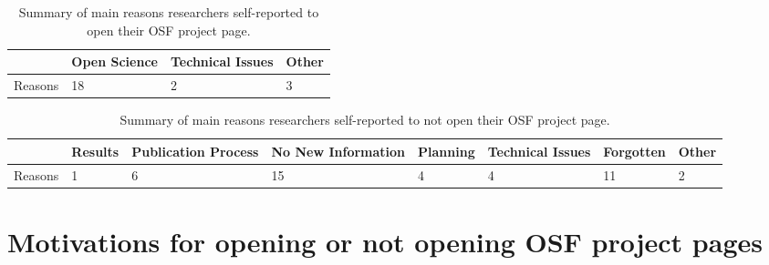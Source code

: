 \documentclass[
  ,jou, a4paper,floatsintext]{apa6}
\begin{document}
\begin{table}[tbp]

\begin{center}
\begin{threeparttable}

\caption{\label{tab:reasonopen}Summary of main reasons researchers self-reported to open their OSF project page.}

\begin{tabular}{llll}
\toprule
 & \multicolumn{1}{c}{Open Science} & \multicolumn{1}{c}{Technical Issues} & \multicolumn{1}{c}{Other}\\
\midrule
Reasons & 18 & 2 & 3\\
\bottomrule
\end{tabular}

\end{threeparttable}
\end{center}

\end{table}

\begin{table}[tbp]

\begin{center}
\begin{threeparttable}

\caption{\label{tab:reasonclosed}Summary of main reasons researchers self-reported to not open their OSF project page.}

\begin{tabular}{llllllll}
\toprule
 & \multicolumn{1}{c}{Results} & \multicolumn{1}{c}{Publication Process} & \multicolumn{1}{c}{No New Information} & \multicolumn{1}{c}{Planning} & \multicolumn{1}{c}{Technical Issues} & \multicolumn{1}{c}{Forgotten} & \multicolumn{1}{c}{Other}\\
\midrule
Reasons & 1 & 6 & 15 & 4 & 4 & 11 & 2\\
\bottomrule
\end{tabular}

\end{threeparttable}
\end{center}

\end{table}

\section{Motivations for opening or not opening OSF project pages}\label{motivations-for-opening-or-not-opening-osf-project-pages}
\end{document}
